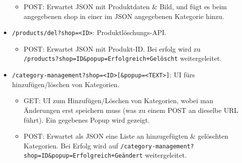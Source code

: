 \begin{itemize}
\begin{itemize}
			\item POST: Erwartet JSON mit Produktdaten \& Bild, und fügt es beim angegebenen shop in einer im JSON angegebenen Kategorie hinzu.
		\end{itemize}
	\item \texttt{/products/del?shop=<ID>}: Produktlöschungs-API.
		\begin{itemize}
			\item POST: Erwartet JSON mit Produkt-ID. Bei erfolg wird zu\\
				\texttt{/products?shop=ID\&popup=Erfolgreich+Gelöscht} weitergeleitet.
		\end{itemize}
	\item \texttt{/category-management?shop=<ID>[\&popup=<TEXT>]}: UI fürs hinzufügen/löschen von Kategorien.
		\begin{itemize}
			\item GET: UI zum Hinzufügen/Löschen von Kategorien, wobei man Änderungen erst speichern muss (was zu einem POST an dieselbe URL führt). Ein gegebenes Popup wird gezeigt.
			\item POST: Erwartet als JSON eine Liste an hinzugefügten \& gelöschten Kategorien. Bei Erfolg wird auf \texttt{/category-management?shop=ID\&popup=Erfolgreich+Geändert} weitergeleitet.
		\end{itemize}
\end{itemize}

